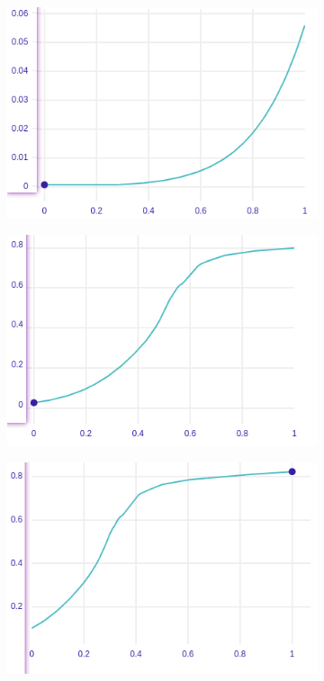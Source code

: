 \documentclass[../main.tex]{subfiles}
\begin{document}
\begin{figure}[H]
    \centering
    \begin{subfigure}[b]{0.4\linewidth}
        \makeatletter{}\makeatother
        \includegraphics[width=\linewidth]{../img/ANN_safety_worst.png}
        \label{fig:ANN-ceteris-paribus-safety}
    \end{subfigure}
    \begin{subfigure}[b]{0.4\linewidth}
        \includegraphics[width=\linewidth]{../img/ANN_safety_mid.png}
    \end{subfigure}
    \begin{subfigure}[b]{0.4\linewidth}
        \includegraphics[width=\linewidth]{../img/ANN_safety_best.png}

\end{subfigure}
\end{figure}
\end{document}
